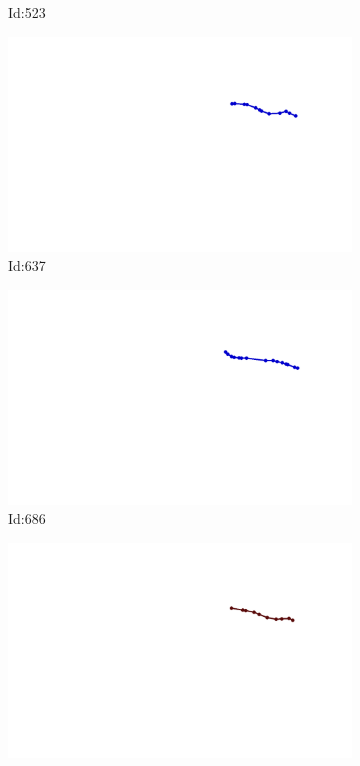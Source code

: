 \documentclass[12pt,twoside]{report}
\begin{document}
\begin{figure}
\begin{subfigure}[b]{0.20\textwidth}
\caption{Id:523}
\end{subfigure}
\begin{subfigure}[b]{0.20\textwidth}
\centering
\includegraphics[width=\textwidth]{../../trajectories/637.png}
\caption{Id:637}
\end{subfigure}
\begin{subfigure}[b]{0.20\textwidth}
\centering
\includegraphics[width=\textwidth]{../../trajectories/686.png}
\caption{Id:686}
\end{subfigure}
\begin{subfigure}[b]{0.20\textwidth}
\centering
\includegraphics[width=\textwidth]{../../trajectories/715.png}

\end{subfigure}
\end{figure}
\end{document}
